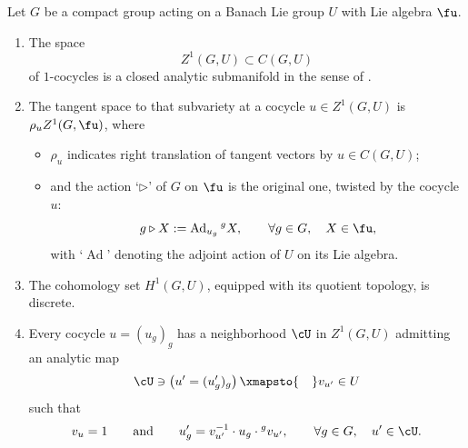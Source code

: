 \begin{Theorem}\label{th:cocyle-man-1}
 Let $G$ be a compact group acting on a Banach Lie group $U$ with Lie algebra $\fu$.
 \begin{enumerate}[$(1)$]\itemsep=0pt
 \item\label{item:cocyle-man-1} The space
 \begin{equation*}
 Z^1(G,U)\subset C(G,U)
 \end{equation*}
 of $1$-cocycles is a closed analytic submanifold in the sense of {\rm \cite[\emph{Section}~5.8.3]{bourb-vars-17}}.

 \item\label{item:cocyle-man-1-tgz1} The tangent space to that subvariety at a cocycle $u\in Z^1(G,U)$ is $\rho_{u} Z^1(G,\fu)$, where
 \begin{itemize}\itemsep=0pt
 \item $\rho_{u}$ indicates right translation of tangent vectors by ${u}\in C(G,U)$;
 \item and the action `$\triangleright$' of $G$ on $\fu$ is the original one, twisted by the cocycle ${u}$:
 \begin{equation}\label{eq:defact}
 g\triangleright X:=\operatorname{Ad}_{u_g} {}^g X,\qquad \forall g\in G,\quad X\in \fu,
 \end{equation}
 with `$\operatorname{Ad}$' denoting the adjoint action of $U$ on its Lie algebra.
 \end{itemize}

 \item\label{item:cocyle-man-1-h1disc} The cohomology set $H^1(G,U)$, equipped with its quotient topology, is discrete.

\item\label{item:cocyle-man-1-coboundsplit} Every cocycle $u=(u_g)_g$ has a neighborhood $\cU$ in $Z^1(G,U)$ admitting an analytic map
 \begin{equation*}
 \cU\ni \left({u'}=(u'_g)_g\right)\xmapsto{\quad} v_{u'}\in U
 \end{equation*}
 such that
 \begin{align*}
 v_{u} =1\qquad\text{and}\qquad
 u'_g =v_{u'}^{-1}\cdot u_g\cdot {}^gv_{u'},\qquad \forall g\in G,\quad u'\in \cU.
 \end{align*}
 \end{enumerate}
\end{Theorem}
